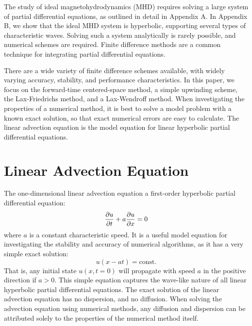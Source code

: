 \documentclass[%
 reprint,
 amsmath,amssymb,
 aps,
]{revtex4-2}
\begin{document}
The study of ideal magnetohydrodynamics (MHD) requires solving a large system of partial differential equations, as outlined in detail in Appendix A. In Appendix B, we show that the ideal MHD system is hyperbolic, supporting several types of characteristic waves. Solving such a system analytically is rarely possible, and numerical schemes are required. Finite difference methods are a common technique for integrating partial differential equations.

There are a wide variety of finite difference schemes available, with widely varying accuracy, stability, and performance characteristics. In this paper, we focus on the forward-time centered-space method, a simple upwinding scheme, the Lax-Friedrichs method, and a Lax-Wendroff method. When investigating the properties of a numerical method, it is best to solve a model problem with a known exact solution, so that exact numerical errors are easy to calculate. The linear advection equation is the model equation for linear hyperbolic partial differential equations.

\section{Linear Advection Equation}

The one-dimensional linear advection equation a first-order hyperbolic partial differential equation:
\begin{equation}
\pdv{u}{t} + a \pdv{u}{x} = 0
\end{equation}
where $a$ is a constant characteristic speed. It is a useful model equation for investigating the stability and accuracy of numerical algorithms, as it has a very simple exact solution:
\begin{equation}
u(x - at) = \text{const.}
\end{equation}
That is, any initial state $u(x, t = 0)$ will propagate with speed $a$ in the positive direction if $a > 0$. This simple equation captures the wave-like nature of all linear hyperbolic partial differential equations. The exact solution of the linear advection equation has no dispersion, and no diffusion. When solving the advection equation using numerical methods, any diffusion and dispersion can be attributed solely to the properties of the numerical method itself.

\end{document}
